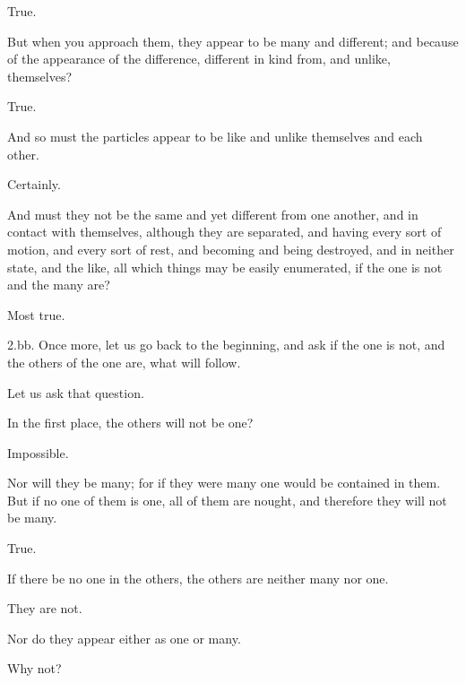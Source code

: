 \documentclass[11pt,letter]{article}
\begin{document}
\par  True.

\par  But when you approach them, they appear to be many and different; and because of the appearance of the difference, different in kind from, and unlike, themselves?

\par  True.

\par  And so must the particles appear to be like and unlike themselves and each other.

\par  Certainly.

\par  And must they not be the same and yet different from one another, and in contact with themselves, although they are separated, and having every sort of motion, and every sort of rest, and becoming and being destroyed, and in neither state, and the like, all which things may be easily enumerated, if the one is not and the many are?

\par  Most true.

\par  2.bb. Once more, let us go back to the beginning, and ask if the one is not, and the others of the one are, what will follow.

\par  Let us ask that question.

\par  In the first place, the others will not be one?

\par  Impossible.

\par  Nor will they be many; for if they were many one would be contained in them. But if no one of them is one, all of them are nought, and therefore they will not be many.

\par  True.

\par  If there be no one in the others, the others are neither many nor one.

\par  They are not.

\par  Nor do they appear either as one or many.

\par  Why not?
\end{document}
